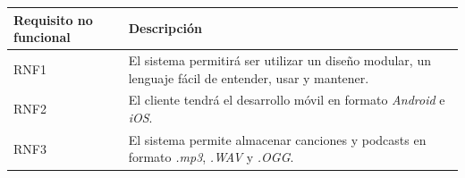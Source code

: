 \documentclass{article}
\begin{document}
\begin{table}[H]
	\begin{tabular}{p{4cm} p{10cm}}
		\hline
		\hline 
		\textbf{Requisito no funcional} & \textbf{Descripción} \\ 
		\hline
		\hline
		RNF1 
		&  El sistema permitirá ser utilizar un diseño modular, un lenguaje fácil de entender, usar y mantener.\\ 
		\hline
		RNF2
		&  El cliente tendrá el desarrollo móvil en formato \textit{Android} e \textit{iOS}.\\ 
		\hline
		RNF3
		& El sistema permite almacenar canciones y podcasts en formato \textit{.mp3}, \textit{.WAV} y \textit{.OGG}. \\
	\end{tabular}
\end{table}
\newpage
\end{document}
